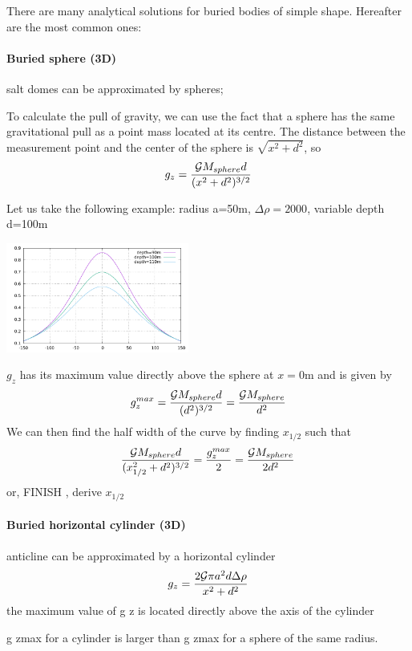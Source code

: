 
There are many analytical solutions for buried bodies of simple shape.
Hereafter are the most common ones:

\paragraph{Buried sphere (3D)}

salt domes can be approximated by spheres; 

To calculate the pull of gravity, we can use the fact that a sphere has the same
gravitational pull as a point mass located at its centre. The distance between 
the measurement point and the center of the sphere is $\sqrt{x^2+d^2}$, so
\[
g_z = \frac{{\cal G} M_{sphere} d }{(x^2 + d^2)^{3/2}}
\]

Let us take the following example: 
radius a=50m, $\Delta \rho=2000$, variable depth d=100m

\begin{center}
\includegraphics[width=6cm]{images/gravity/buriedsphere}
\end{center}

$g_z$ has its maximum value directly above the sphere at $x=0$m and is 
given by 
\[
g_{z}^{max}
= \frac{{\cal G} M_{sphere} d }{(d^2)^{3/2}}
= \frac{{\cal G} M_{sphere}  }{d^2}
\]
We can then find the half width of the curve by finding $x_{1/2}$ such that 
\[
\frac{{\cal G} M_{sphere} d }{(x_{1/2}^2 + d^2)^{3/2}} =
\frac{g_{z}^{max}}{2} = \frac{ {\cal G} M_{sphere} }{2 d^2}
\]
or, 
FINISH , derive $x_{1/2}$


\paragraph{Buried horizontal cylinder (3D)} 

anticline can be approximated by a horizontal cylinder
\[
g_z=\frac{2 {\cal G} \pi a^2 d \Delta \rho}{x^2+d^2}
\]
the maximum value of g z is located directly above the axis of the cylinder

g zmax for a cylinder is larger than g zmax for a sphere of the same radius.

